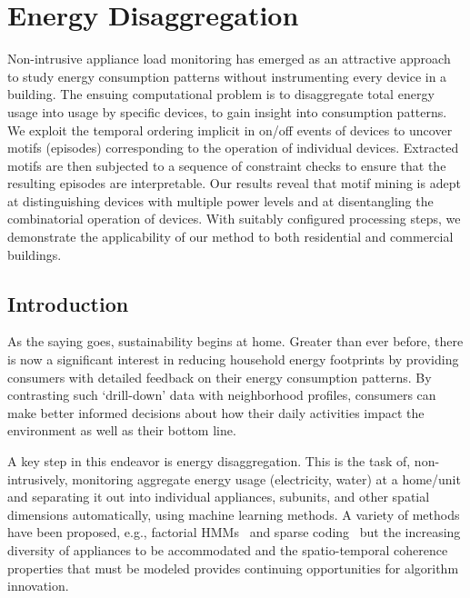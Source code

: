 \chapter{Energy Disaggregation}
Non-intrusive appliance load monitoring has emerged as an attractive
approach to study energy consumption patterns without instrumenting every
device in a building.
The ensuing computational problem is to disaggregate
total energy usage into usage by specific
devices, to gain insight into consumption patterns. We exploit
the temporal ordering implicit in on/off events of devices to uncover motifs
(episodes) corresponding to the operation of individual devices. Extracted
motifs are then subjected to a sequence of constraint checks to ensure that
the resulting episodes are interpretable. Our results reveal that
motif mining is adept at distinguishing devices with multiple power levels
and at disentangling the combinatorial operation of devices. With suitably
configured processing steps, we demonstrate
the applicability of our method to both residential and commercial buildings.

%
\section{Introduction}
As the saying goes, sustainability begins at home. Greater than ever
before, there is now a significant interest in reducing household energy
footprints by providing consumers with detailed feedback
on their energy consumption patterns. By contrasting such `drill-down' data
with neighborhood profiles, consumers can make better informed decisions about
how their daily activities impact the environment as well as their bottom line.

A key step in this endeavor is energy disaggregation. This is the task of,
non-intrusively, monitoring aggregate energy usage  (electricity, water) at
a home/unit and separating it out into individual appliances, subunits, and
other spatial dimensions automatically, using machine learning methods.
A variety of methods have been proposed, e.g.,
factorial HMMs~\cite{kim2011unsupervised} and
sparse coding~\cite{kolter2012aistat}
but the increasing diversity of appliances to be accommodated and
the spatio-temporal coherence properties that must be
modeled provides continuing opportunities for algorithm innovation.

